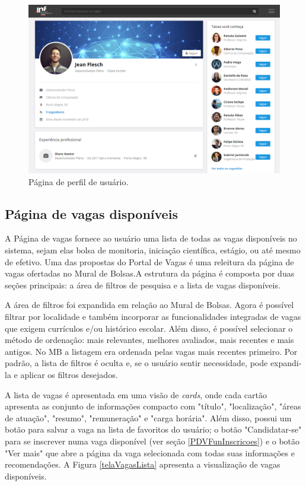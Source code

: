 \begin{figure}[H]
    \caption{Página de perfil de usuário.}
       	\begin{center}
            \includegraphics[width=1\textwidth]{figuras/perfil.png}
        \end{center}
    \label{telaUserProfile}
\end{figure}

\subsection{Página de vagas disponíveis}
\label{PDVFunVagas}

A Página de vagas fornece ao usuário uma lista de todas as vagas disponíveis no sistema, sejam elas bolsa de monitoria, iniciação científica, estágio, ou até mesmo de efetivo. Uma das propostas do Portal de Vagas é uma releitura da página de vagas ofertadas no Mural de Bolsas.A estrutura da página é composta por duas seções principais: a área de filtros de pesquisa e a lista de vagas disponíveis.

A área de filtros foi expandida em relação ao Mural de Bolsas. Agora é possível filtrar por localidade e também incorporar as funcionalidades integradas de vagas que exigem currículos e/ou histórico escolar. Além disso, é possível selecionar o método de ordenação: mais relevantes, melhores avaliados, mais recentes e mais antigos. No MB a listagem era ordenada pelas vagas mais recentes primeiro. Por padrão, a lista de filtros é oculta e, se o usuário sentir necessidade, pode expandi-la e aplicar os filtros desejados. 

A lista de vagas é apresentada em uma visão de \textit{cards}, onde cada cartão apresenta as conjunto de informações compacto com "título", "localização", "áreas de atuação", "resumo", "remuneração" e "carga horária". Além disso, possui um botão para salvar a vaga na lista de favoritos do usuário; o botão "Candidatar-se" para se inscrever numa vaga disponível (ver seção \ref{PDVFunInscricoes}) e o botão "Ver mais" que abre a página da vaga selecionada com todas suas informações e recomendações. A Figura \ref{telaVagasLista} apresenta a visualização de vagas disponíveis.

